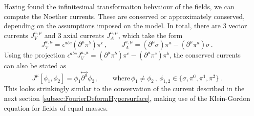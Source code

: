 Having found the infinitesimal transformaiton behvaiour of the fields, we can compute the Noether currents. These are conserved or approximately conserved, depending on the assumptions imposed on the model. In total, there are 3 vector currents $J_V^{a,\mu}$ and 3 axial currents $J_A^{a,\mu}$, which take the form
\begin{equation}
    J_V^{a,\mu}=\epsilon^{abc}(\partial^\mu\pi^b)\pi^c\,,\qquad J_A^{a,\mu}=(\partial^\mu\sigma)\pi^a-(\partial^\mu\pi^a)\sigma\,.
\end{equation}
Using the projection $\epsilon^{abc}J_V^{a,\mu}=(\partial^\mu\pi^b)\pi^c-(\partial^\mu\pi^c)\pi^b$, the conserved currents can also be stated as
\begin{equation}
    J^\mu[\phi_1,\phi_2]=\phi_1\overset{\leftrightarrow}{\partial^\mu}\phi_2\,,\qquad\text{where}\,\phi_{1}\neq\phi_2\,,\,\phi_{1,2}\in\{\sigma,\pi^0,\pi^1,\pi^2\}\,.
\end{equation}
This looks strinkingly similar to the conservation of the current described in the next section \eqref{subsec:FourierDeformHypersurface}, making use of the Klein-Gordon equation for fields of equal masses. 

